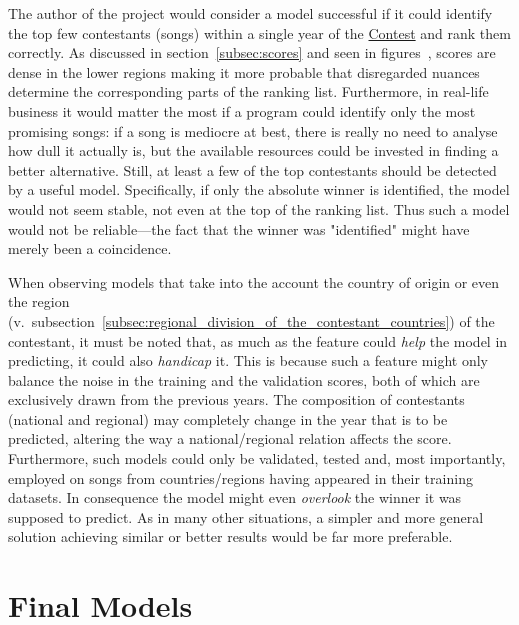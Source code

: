 \documentclass[conference, a4paper, 12pt]{IEEEtran}
\begin{document}
    The author of the project would consider a model successful if it could identify the top few contestants (songs) within a single year of the \href{http://eurovision.tv/}{Contest} and rank them correctly. As discussed in section~\ref{subsec:scores} and seen in figures~, scores are dense in the lower regions making it more probable that disregarded nuances determine the corresponding parts of the ranking list. Furthermore, in real-life business it would matter the most if a program could identify only the most promising songs: if a song is mediocre at best, there is really no need to analyse how dull it actually is, but the available resources could be invested in finding a better alternative. Still, at least a few of the top contestants should be detected by a useful model. Specifically, if only the absolute winner is identified, the model would not seem stable, not even at the top of the ranking list. Thus such a model would not be reliable---the fact that the winner was "identified" might have merely been a coincidence.

    \par

    When observing models that take into the account the country of origin or even the region (v.\ subsection~\ref{subsec:regional_division_of_the_contestant_countries}) of the contestant, it must be noted that, as much as the feature could \emph{help} the model in predicting, it could also \emph{handicap} it. This is because such a feature might only balance the noise in the training and the validation scores, both of which are exclusively drawn from the previous years. The composition of contestants (national and regional) may completely change in the year that is to be predicted, altering the way a national/regional relation affects the score. Furthermore, such models could only be validated, tested and, most importantly, employed on songs from countries/regions having appeared in their training datasets. In consequence the model might even \emph{overlook} the winner it was supposed to predict. As in many other situations, a simpler and more general solution achieving similar or better results would be far more preferable.

    \par

    \section{Final Models}
    \label{sec:final_models}
\end{document}
